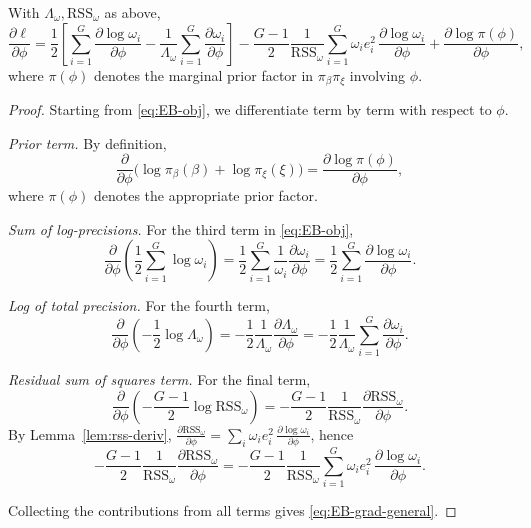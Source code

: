 \begin{proposition}
\label{prop:grad}
With \(\Lambda_\omega,\mathrm{RSS}_\omega\) as above,
\begin{equation}
\label{eq:EB-grad-general}
\frac{\partial \ell}{\partial \phi}
=\frac{1}{2}\!\left[
\sum_{i=1}^G \frac{\partial \log \omega_i}{\partial \phi}
-\frac{1}{\Lambda_\omega}\sum_{i=1}^G \frac{\partial \omega_i}{\partial \phi}
\right]
-\frac{G-1}{2}\frac{1}{\mathrm{RSS}_\omega}
\sum_{i=1}^G \omega_i e_i^2\,\frac{\partial \log \omega_i}{\partial \phi}
+\frac{\partial \log \pi(\phi)}{\partial \phi},
\end{equation}
where \(\pi(\phi)\) denotes the marginal prior factor in \(\pi_\beta\pi_\xi\) involving \(\phi\).
\end{proposition}
\begin{proof}
Starting from \eqref{eq:EB-obj}, we differentiate term by term with respect to \(\phi\).

\emph{Prior term.}
By definition,
\[
\frac{\partial}{\partial\phi}\big(\log \pi_\beta(\beta)+\log \pi_\xi(\xi)\big)
=\frac{\partial \log \pi(\phi)}{\partial \phi},
\]
where \(\pi(\phi)\) denotes the appropriate prior factor.

\emph{Sum of log-precisions.}
For the third term in \eqref{eq:EB-obj},
\[
\frac{\partial}{\partial\phi}\left(\frac{1}{2}\sum_{i=1}^G \log\omega_i\right)
=\frac{1}{2}\sum_{i=1}^G \frac{1}{\omega_i}\frac{\partial \omega_i}{\partial\phi}
=\frac{1}{2}\sum_{i=1}^G \frac{\partial \log \omega_i}{\partial\phi}.
\]

\emph{Log of total precision.}
For the fourth term,
\[
\frac{\partial}{\partial\phi}\left(-\frac{1}{2}\log\Lambda_\omega\right)
=-\frac{1}{2}\frac{1}{\Lambda_\omega}\frac{\partial \Lambda_\omega}{\partial\phi}
=-\frac{1}{2}\frac{1}{\Lambda_\omega}\sum_{i=1}^G \frac{\partial \omega_i}{\partial\phi}.
\]

\emph{Residual sum of squares term.}
For the final term,
\[
\frac{\partial}{\partial\phi}\left(-\frac{G-1}{2}\log \mathrm{RSS}_\omega\right)
=-\frac{G-1}{2}\frac{1}{\mathrm{RSS}_\omega}
\frac{\partial \mathrm{RSS}_\omega}{\partial\phi}.
\]
By Lemma~\ref{lem:rss-deriv},
\(\frac{\partial \mathrm{RSS}_\omega}{\partial\phi}
=\sum_i \omega_i e_i^2\,\frac{\partial \log \omega_i}{\partial\phi}\),
hence
\[
-\frac{G-1}{2}\frac{1}{\mathrm{RSS}_\omega}
\frac{\partial \mathrm{RSS}_\omega}{\partial\phi}
=-\frac{G-1}{2}\frac{1}{\mathrm{RSS}_\omega}
\sum_{i=1}^G \omega_i e_i^2\,\frac{\partial \log \omega_i}{\partial\phi}.
\]

Collecting the contributions from all terms gives \eqref{eq:EB-grad-general}.
\end{proof}

